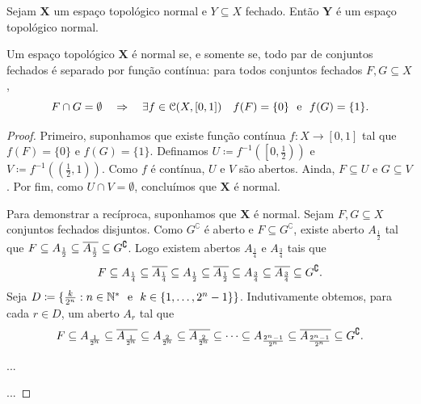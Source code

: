 \begin{prop}
	Sejam $\bm X$ um espaço topológico normal e $Y \subseteq X$ fechado. Então $\bm Y$ é um espaço topológico normal.
\end{prop}


\begin{lema}[Urysohn]
	Um espaço topológico $\bm X$ é normal se, e somente se, todo par de conjuntos fechados é separado por função contínua: para todos conjuntos fechados $F,G \subseteq X$,
	\begin{equation*}
	F \cap G = \emptyset \quad \Rightarrow \quad \exists f \in \mathcal{C}(X,[0,1]) \quad f(F)=\{0\} \text{\ \ e\ \ } f(G)=\{1\}.
	\end{equation*}
\end{lema}
\begin{proof}
	Primeiro, suponhamos que existe função contínua $f:X \to [0,1]$ tal que $f(F)= \{0\}$ e $f(G)=\{1\}$. Definamos $U \coloneqq f^{-1}(\left[0,\frac{1}{2}\right))$ e $V \coloneqq f^{-1}((\frac{1}{2},1))$. Como $f$ é contínua, $U$ e $V$ são abertos. Ainda, $F \subseteq U$ e $G \subseteq V$. Por fim, como $U \cap V = \emptyset$, concluímos que $\bm X$ é normal.

	Para demonstrar a recíproca, suponhamos que $\bm X$ é normal. Sejam $F,G \subseteq X$ conjuntos fechados disjuntos. Como $G^\complement$ é aberto e $F \subseteq G^\complement$, existe aberto $A_{\frac{1}{2}}$ tal que $F \subseteq A_{\frac{1}{2}} \subseteq \overline{A_{\frac{1}{2}}} \subseteq G^\complement$. Logo existem abertos $A_{\frac{1}{4}}$ e $A_{\frac{3}{4}}$ tais que
	\begin{equation*}
	F \subseteq A_{\frac{1}{4}} \subseteq \overline{A_{\frac{1}{4}}} \subseteq A_{\frac{1}{2}} \subseteq \overline{A_{\frac{1}{2}}} \subseteq A_{\frac{3}{4}} \subseteq \overline{A_{\frac{3}{4}}} \subseteq G^\complement.
	\end{equation*}
Seja $D \coloneqq \{\frac{k}{2^n}:n \in \N^* \e k \in \{1,\ldots,2^n-1\}\}$. Indutivamente obtemos, para cada $r \in D$, um aberto $A_r$ tal que
	\begin{equation*}
	F \subseteq A_{\frac{1}{2^n}} \subseteq \overline{A_{\frac{1}{2^n}}} \subseteq A_{\frac{2}{2^n}} \subseteq \overline{A_{\frac{2}{2^n}}}\subseteq \cdots \subseteq A_{\frac{2^n-1}{2^n}} \subseteq \overline{A_{\frac{2^n-1}{2^n}}} \subseteq G^\complement.
	\end{equation*}
	
	...
	
	...
\end{proof}

















